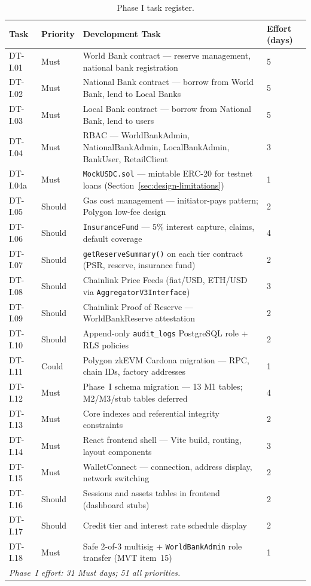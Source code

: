 \documentclass[12pt,a4paper]{report}
\newcommand{\tableheadcolor}{\rowcolor{TableHeadBg}}
\begin{document}
\enlargethispage{1.1cm}
\begin{table}[H]
\centering
\caption[Phase I task register]{Phase I task register.}
\label{tab:phaseI-contracts}
\scriptsize
\setlength{\tabcolsep}{2.5pt}
\renewcommand{\arraystretch}{0.98}
\begin{tabular}{p{1.6cm}p{1.5cm}p{7.7cm}p{1.2cm}}
\toprule
\tableheadcolor
\textbf{Task} & \textbf{Priority} & \textbf{Development Task} & \textbf{Effort (days)} \\
\midrule
DT-I.01 & Must & World Bank contract --- reserve management, national bank registration & 5 \\
DT-I.02 & Must & National Bank contract --- borrow from World Bank, lend to Local Banks & 5 \\
DT-I.03 & Must & Local Bank contract --- borrow from National Bank, lend to users & 5 \\
DT-I.04 & Must & RBAC --- WorldBankAdmin, NationalBankAdmin, LocalBankAdmin, BankUser, RetailClient & 3 \\
DT-I.04a & Must & \texttt{MockUSDC.sol} --- mintable ERC-20 for testnet loans (Section~\ref{sec:design-limitations}) & 1 \\
DT-I.05 & Should & Gas cost management --- initiator-pays pattern; Polygon low-fee design & 2 \\
DT-I.06 & Should & \texttt{InsuranceFund} --- 5\% interest capture, claims, default coverage & 4 \\
DT-I.07 & Should & \texttt{getReserveSummary()} on each tier contract (PSR, reserve, insurance fund) & 2 \\
DT-I.08 & Should & Chainlink Price Feeds (fiat/USD, ETH/USD via \texttt{AggregatorV3Interface}) & 3 \\
DT-I.09 & Should & Chainlink Proof of Reserve --- WorldBankReserve attestation & 2 \\
DT-I.10 & Should & Append-only \texttt{audit\_logs} PostgreSQL role + RLS policies & 2 \\
DT-I.11 & Could & Polygon zkEVM Cardona migration --- RPC, chain IDs, factory addresses & 1 \\
DT-I.12 & Must & Phase~I schema migration --- 13 M1 tables; M2/M3/stub tables deferred & 4 \\
DT-I.13 & Must & Core indexes and referential integrity constraints & 2 \\
DT-I.14 & Must & React frontend shell --- Vite build, routing, layout components & 3 \\
DT-I.15 & Must & WalletConnect --- connection, address display, network switching & 2 \\
DT-I.16 & Should & Sessions and assets tables in frontend (dashboard stubs) & 2 \\
DT-I.17 & Should & Credit tier and interest rate schedule display & 2 \\
DT-I.18 & Must & Safe 2-of-3 multisig + \texttt{WorldBankAdmin} role transfer (MVT item~15) & 1 \\
\multicolumn{3}{l}{\textit{Phase~I effort: 31 Must days; 51 all priorities.}} & \\
\bottomrule
\end{tabular}
\end{table}
\end{document}
